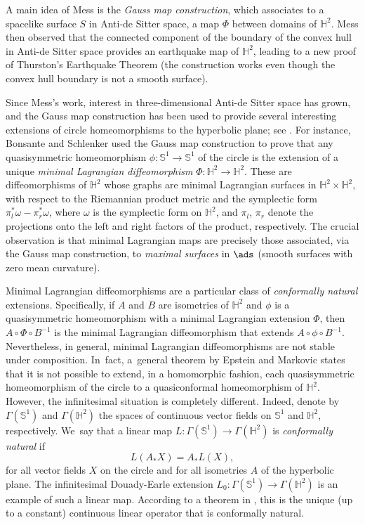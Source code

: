 A main idea of Mess is the \emph{Gauss map construction}, which associates to a spacelike surface \(S\) in Anti-de Sitter space, a map \(\Phi\) between domains of \(\mathbb{H}^2\). Mess then observed that the connected component of the boundary of the convex hull in Anti-de Sitter space provides an earthquake map of \(\mathbb{H}^2\), leading to a new proof of Thurston's Earthquake Theorem \cite{Thurston} (the construction works even though the convex hull boundary is not a smooth surface).

Since Mess's work, interest in three-dimensional Anti-de Sitter space has grown, and the Gauss map construction has been used to provide several interesting extensions of circle homeomorphisms to the hyperbolic plane; see \cite{Maximalsurface, Areapreserving, SEP19}. For instance, Bonsante and Schlenker used the Gauss map construction to prove that any quasisymmetric homeomorphism \(\phi:\mathbb{S}^1 \to \mathbb{S}^1\) of the circle is the extension of a unique \emph{minimal Lagrangian diffeomorphism} \(\Phi:\mathbb{H}^2 \to \mathbb{H}^2\). These are diffeomorphisms of \(\mathbb{H}^2\) whose graphs are minimal Lagrangian surfaces in \(\mathbb{H}^2 \times \mathbb{H}^2\), with respect to the Riemannian product metric and the symplectic form \(\pi_l^* \omega - \pi_r^* \omega\), where \(\omega\) is the symplectic form on \(\mathbb{H}^2\), and \(\pi_l\), \(\pi_r\) denote the projections onto the left and right factors of the product, respectively.
The crucial observation is that minimal Lagrangian maps are precisely those associated, via the Gauss map construction, to \emph{maximal surfaces} in $\ads$ (\ie smooth surfaces with zero mean curvature).

Minimal Lagrangian diffeomorphisms are a particular class of \emph{conformally natural} extensions. Specifically, if \(A\) and \(B\) are isometries of \(\mathbb{H}^2\) and \(\phi\) is a quasisymmetric homeomorphism with a minimal Lagrangian extension \(\Phi\), then \(A \circ \Phi \circ B^{-1}\) is the minimal Lagrangian diffeomorphism that extends \(A \circ \phi \circ B^{-1}\). Nevertheless, in general, minimal Lagrangian diffeomorphisms are not stable under composition. In~fact, a~general theorem by Epstein and Markovic \cite{Stopdreamingthm} states that it is not possible to extend, in a homomorphic fashion, each quasisymmetric homeomorphism of the circle to a quasiconformal homeomorphism of \(\mathbb{H}^2\). However, the infinitesimal situation is completely different. Indeed, denote by $\Gamma(\mathbb{S}^1)$ and $\Gamma(\mathbb{H}^2)$ the spaces of continuous vector fields on $\mathbb{S}^1$ and $\mathbb{H}^2$, respectively. We~say that a linear map $L: \Gamma(\mathbb{S}^1) \to \Gamma(\mathbb{H}^2)$ is \emph{conformally natural} if
\[
L(A_* X) = A_* L(X),
\]
for all vector fields $X$ on the circle and for all isometries $A$ of the hyperbolic plane. The infinitesimal Douady-Earle extension $L_0: \Gamma(\mathbb{S}^1) \to \Gamma(\mathbb{H}^2)$ is an example of such a linear map. According to a theorem in \cite{Uniqueness_of_operator_L}, this is the unique (up to a constant) continuous linear operator that is conformally natural.

